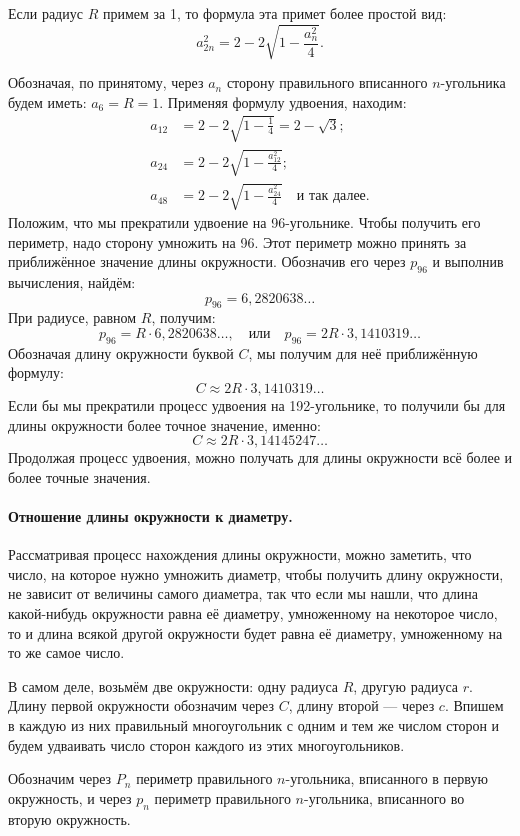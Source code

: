 Если радиус $R$ примем за 1, то формула эта примет более простой вид:
\[a_{2n}^2=2-2\sqrt{1-\frac{a_n^2}4}.\]


Обозначая, по принятому, через $a_n$ сторону правильного вписанного $n$-угольника будем иметь:
$a_6=R=1$.
Применяя формулу удвоения, находим:
\begin{align*}
a_{12}&=2-2\sqrt{1-\tfrac14}=2-\sqrt3;
\\
a_{24}&=2-2\sqrt{1-\tfrac{a_{12}^2}{4}};
\\
a_{48}&=2-2\sqrt{1-\tfrac{a_{24}^2}{4}}\quad\text{и так далее.}
\end{align*}
Положим, что мы прекратили удвоение на 96-угольнике.
Чтобы получить его периметр, надо сторону умножить на 96.
Этот периметр можно принять за приближённое значение длины окружности.
Обозначив его через $p_{96}$ и выполнив вычисления, найдём:
\[p_{96} = 6{,}2820638\dots\]
При радиусе, равном $R$, получим:
\[p_{96}=R\cdot6{,}2820638\dots,
\quad\text{или}\quad
p_{96}=2R\cdot3{,}1410319\dots\]
Обозначая длину окружности буквой $C$, мы получим для неё приближённую формулу:
\[C\approx 2R\cdot3{,}1410319\dots\]
Если бы мы прекратили процесс удвоения на 192-угольнике, то получили бы для длины окружности более точное значение, именно:
\[C\approx2R\cdot3{,}14145247\dots\]
Продолжая процесс удвоения, можно получать для длины окружности всё более и более точные значения.

\paragraph{Отношение длины окружности к диаметру.}\label{1938/238}
Рассматривая процесс нахождения длины окружности, можно заметить, что число, на которое нужно умножить диаметр, чтобы получить длину окружности, не зависит от величины самого диаметра, так что если мы нашли, что длина какой-нибудь окружности равна её диаметру, умноженному на некоторое число, то и длина всякой другой окружности будет равна её диаметру, умноженному на то же самое число.

В самом деле, возьмём две окружности:
одну радиуса $R$, другую радиуса $r$.
Длину первой окружности обозначим через $C$, длину второй — через $c$.
Впишем в каждую из них правильный многоугольник с одним и тем же числом сторон и будем удваивать число сторон каждого из этих многоугольников.

Обозначим через $P_n$ периметр правильного $n$-угольника, вписанного в первую окружность, и через $p_n$ периметр правильного $n$-угольника, вписанного во вторую окружность.

